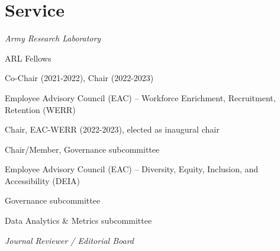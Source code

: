 \section{\sc Service}

\textit{Army Research Laboratory}
\begin{list2}
\item ARL Fellows 
\begin{list2}
\item Co-Chair (2021-2022), Chair (2022-2023)
\end{list2}

\item Employee Advisory Council (EAC) -- Workforce Enrichment, Recruitment, Retention (WERR)
\begin{list2}
\item Chair, EAC-WERR (2022-2023), elected as inaugural chair
\item Chair/Member, Governance subcommittee
\end{list2}

\item Employee Advisory Council (EAC) -- Diversity, Equity, Inclusion, and Accessibility (DEIA)
\begin{list2}
\item Governance subcommittee
\item Data Analytics \& Metrics subcommittee
\end{list2}

\end{list2}

\textit{Journal Reviewer / Editorial Board}


